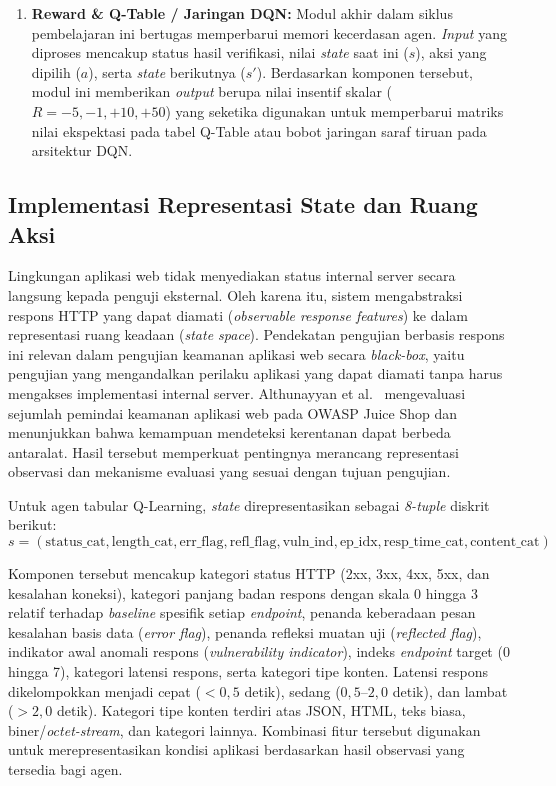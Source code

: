 \begin{enumerate}
\begin{enumerate}
    \item \textbf{Reward \& Q-Table / Jaringan DQN:} 
    Modul akhir dalam siklus pembelajaran ini bertugas memperbarui memori kecerdasan agen. \textit{Input} yang diproses mencakup status hasil verifikasi, nilai \textit{state} saat ini ($s$), aksi yang dipilih ($a$), serta \textit{state} berikutnya ($s'$). Berdasarkan komponen tersebut, modul ini memberikan \textit{output} berupa nilai insentif skalar ($R = -5, -1, +10, +50$) yang seketika digunakan untuk memperbarui matriks nilai ekspektasi pada tabel Q-Table atau bobot jaringan saraf tiruan pada arsitektur DQN.
\end{enumerate}

\subsection{Implementasi Representasi State dan Ruang Aksi}

Lingkungan aplikasi web tidak menyediakan status internal server secara
langsung kepada penguji eksternal. Oleh karena itu, sistem mengabstraksi
respons HTTP yang dapat diamati (\textit{observable response features})
ke dalam representasi ruang keadaan (\textit{state space}). Pendekatan
pengujian berbasis respons ini relevan dalam pengujian keamanan aplikasi
web secara \textit{black-box}, yaitu pengujian yang mengandalkan perilaku
aplikasi yang dapat diamati tanpa harus mengakses implementasi internal
server. Althunayyan et al.~\cite{althunayyan2022blackbox} mengevaluasi
sejumlah pemindai keamanan aplikasi web pada OWASP Juice Shop dan
menunjukkan bahwa kemampuan mendeteksi kerentanan dapat berbeda
antaralat. Hasil tersebut memperkuat pentingnya merancang representasi
observasi dan mekanisme evaluasi yang sesuai dengan tujuan pengujian.

Untuk agen tabular Q-Learning, \textit{state} direpresentasikan sebagai
\textit{8-tuple} diskrit berikut:
\begin{equation}
s = (\text{status\_cat}, \text{length\_cat}, \text{err\_flag},
\text{refl\_flag}, \text{vuln\_ind}, \text{ep\_idx},
\text{resp\_time\_cat}, \text{content\_cat})
\label{eq:ql_state}
\end{equation}

Komponen tersebut mencakup kategori status HTTP (2xx, 3xx, 4xx, 5xx,
dan kesalahan koneksi), kategori panjang badan respons dengan skala
0 hingga 3 relatif terhadap \textit{baseline} spesifik setiap
\textit{endpoint}, penanda keberadaan pesan kesalahan basis data
(\textit{error flag}), penanda refleksi muatan uji
(\textit{reflected flag}), indikator awal anomali respons
(\textit{vulnerability indicator}), indeks \textit{endpoint} target
(0 hingga 7), kategori latensi respons, serta kategori tipe konten.
Latensi respons dikelompokkan menjadi cepat ($<0{,}5$ detik), sedang
($0{,}5$--$2{,}0$ detik), dan lambat ($>2{,}0$ detik). Kategori tipe
konten terdiri atas JSON, HTML, teks biasa, biner/\textit{octet-stream},
dan kategori lainnya. Kombinasi fitur tersebut digunakan untuk
merepresentasikan kondisi aplikasi berdasarkan hasil observasi yang
tersedia bagi agen.


\end{enumerate}
